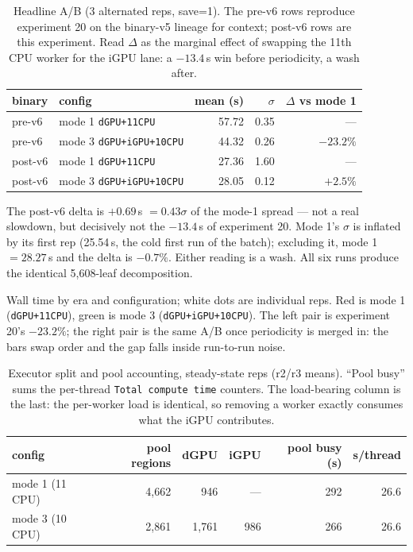 \documentclass[
	english,
	letterpaper, oneside
]{article}
\begin{document}
\begin{table}[H]
\centering
\caption{Headline A/B (3 alternated reps, save=1). The pre-v6 rows reproduce
experiment 20 on the binary-v5 lineage for context; post-v6 rows are this experiment. Read $\Delta$ as the
marginal effect of swapping the 11th CPU worker for the iGPU lane: a
$-13.4$\,s win before periodicity, a wash after.\label{tab:headline}}
\small
\begin{tabular}{llrrr}
\toprule
binary & config & mean (s) & $\sigma$ & $\Delta$ vs mode 1 \\
\midrule
pre-v6 & mode 1 \texttt{dGPU+11CPU} & 57.72 & 0.35 & --- \\
pre-v6 & mode 3 \texttt{dGPU+iGPU+10CPU} & 44.32 & 0.26 & $-23.2\%$ \\
\midrule
post-v6 & mode 1 \texttt{dGPU+11CPU} & 27.36 & 1.60 & --- \\
post-v6 & mode 3 \texttt{dGPU+iGPU+10CPU} & 28.05 & 0.12 & $+2.5\%$ \\
\bottomrule
\end{tabular}
\end{table}

The post-v6 delta is $+0.69$\,s $=0.43\sigma$ of the mode-1 spread --- not a
real slowdown, but decisively not the $-13.4$\,s of experiment 20. Mode 1's
$\sigma$ is inflated by its first rep (25.54\,s, the cold first run of the
batch); excluding it, mode 1 $=28.27$\,s and the delta is $-0.7\%$. Either
reading is a wash. All six runs produce the identical 5{,}608-leaf
decomposition.

            {Wall time by era and configuration; white dots are individual
             reps. Red is mode 1 (\texttt{dGPU+11CPU}), green is mode 3
             (\texttt{dGPU+iGPU+10CPU}). The left pair is experiment 20's
             $-23.2\%$; the right pair is the same A/B once periodicity is
             merged in: the bars swap order and the gap falls inside
             run-to-run noise. \label{fig:collapse}}

\begin{table}[H]
\centering
\caption{Executor split and pool accounting, steady-state reps (r2/r3
means). ``Pool busy'' sums the per-thread \texttt{Total compute time}
counters. The load-bearing column is the last: the per-worker load is
identical, so removing a worker exactly consumes what the iGPU
contributes.\label{tab:split}}
\begin{tabular}{lrrrrr}
\toprule
config & pool regions & dGPU & iGPU & pool busy (s) & s/thread \\
\midrule
mode 1 (11 CPU) & 4{,}662 & 946 & --- & 292 & 26.6 \\
mode 3 (10 CPU) & 2{,}861 & 1{,}761 & 986 & 266 & 26.6 \\
\bottomrule
\end{tabular}
\end{table}
\end{document}
